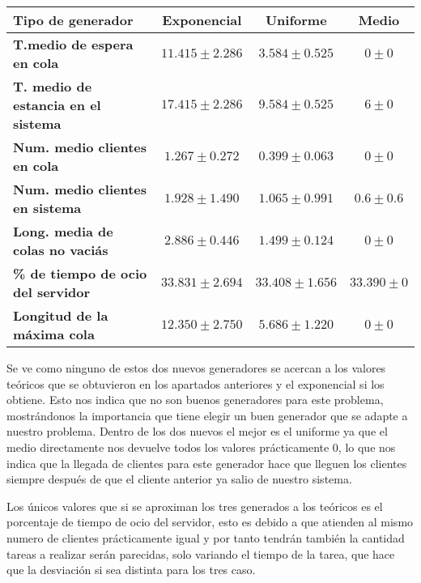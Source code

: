 \documentclass[]{article}
\begin{document}
\begin{table}[H]
	\begin{center}
		\begin{tabularx}{1\textwidth}{|X|c|c|c|}
			\hline
			\textbf{Tipo de generador}&\textbf{ Exponencial} &  \textbf{Uniforme} & \textbf{Medio} \\
			\hline \hline
			\textbf{T.medio de espera en cola}& $11.415\pm2.286$ & $3.584\pm0.525$ & $0\pm0$ \\ \hline
			\textbf{T. medio de estancia en el sistema} & $17.415\pm2.286$ & $9.584\pm0.525$ & $6\pm0$ \\ \hline
			\textbf{Num. medio clientes en cola} & $1.267\pm0.272$& $0.399\pm0.063$ & $0\pm0$ \\  \hline
			\textbf{Num. medio clientes en sistema} & $1.928\pm1.490$ & $1.065\pm0.991$ & $0.6\pm0.6$ \\ \hline
			\textbf{Long. media de colas no vaciás} & $2.886\pm0.446$& $1.499\pm0.124$ & $0\pm0$ \\ \hline
			\textbf{\% de tiempo de ocio del servidor} & $33.831\pm2.694$ & $33.408\pm1.656$ & $33.390\pm0$ \\ \hline
			\textbf{Longitud de la máxima cola} &$12.350\pm2.750$& $5.686\pm1.220$ & $0\pm0$    \\ \hline
		\end{tabularx}
		
	\end{center}
	\end{table}
Se ve como ninguno de estos dos nuevos generadores se acercan a los valores teóricos que se obtuvieron en los apartados anteriores y el exponencial si los obtiene. Esto nos indica que no son  buenos generadores para este problema, mostrándonos la importancia que tiene elegir un buen generador que se adapte a nuestro problema. Dentro de los dos nuevos el mejor es el uniforme ya que el medio directamente nos devuelve todos los valores prácticamente 0, lo que nos indica que la llegada de clientes para este generador hace que lleguen los clientes siempre después de que el cliente anterior ya salio de nuestro sistema.

Los únicos valores que si se aproximan los tres generados a los teóricos es el porcentaje de tiempo de ocio del servidor, esto es debido a que atienden al mismo numero de clientes prácticamente igual y por tanto tendrán también la cantidad tareas a realizar serán parecidas, solo variando el tiempo de la tarea, que hace que la desviación si sea distinta para los tres caso.
\end{document}

